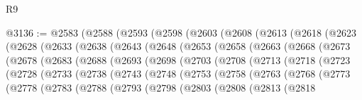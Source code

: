 \begin{lexlean}{R9}
\begin{coremodule}
@3136 := @2583
    (@2588
      (@2593
        (@2598
          (@2603
            (@2608
              (@2613
                (@2618
                  (@2623
                    (@2628
                      (@2633
                        (@2638
                          (@2643
                            (@2648
                              (@2653
                                (@2658
                                  (@2663
                                    (@2668
                                      (@2673
                                        (@2678
                                          (@2683
                                            (@2688
                                              (@2693
                                                (@2698
                                                  (@2703
                                                    (@2708
                                                      (@2713
                                                        (@2718
                                                          (@2723
                                                            (@2728
                                                              (@2733
                                                                (@2738
                                                                  (@2743
                                                                    (@2748
                                                                      (@2753
                                                                        (@2758
                                                                          (@2763
                                                                            (@2768
                                                                              (@2773
                                                                                (@2778
                                                                                  (@2783
                                                                                    (@2788
                                                                                      (@2793
                                                                                        (@2798
                                                                                          (@2803
                                                                                            (@2808
                                                                                              (@2813
                                                                                                (@2818

\end{coremodule}
\end{lexlean}
